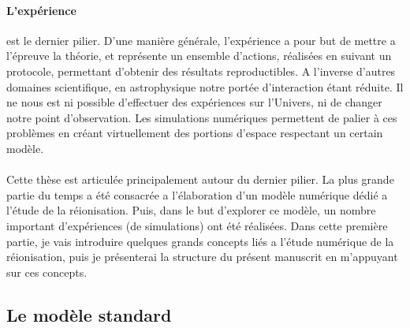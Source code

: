 \paragraph{L'expérience} est le dernier pilier.
D'une manière générale, l'expérience a pour but de mettre a l’épreuve la théorie, et représente un ensemble d'actions, réalisées en suivant un protocole, permettant d'obtenir des résultats reproductibles.
A l'inverse d'autres domaines scientifique, en astrophysique notre portée d'interaction étant réduite.
Il ne nous est ni possible d'effectuer des expériences sur l'Univers, ni de changer notre point d'observation.
Les simulations numériques permettent de palier à ces problèmes en créant virtuellement des portions d'espace respectant un certain modèle.



\paragraph{}

Cette thèse est articulée principalement autour du dernier pilier.
La plus grande partie du temps a été consacrée a l'élaboration d'un modèle numérique dédié a l'étude de la réionisation.
Puis, dans le but d'explorer ce modèle, un nombre important d'expériences (de simulations) ont été réalisées.
Dans cette première partie, je vais introduire quelques grands concepts liés a l'étude numérique de la réionisation, puis je présenterai la structure du présent manuscrit en m'appuyant sur ces concepts.

\subsection*{Le modèle standard}


